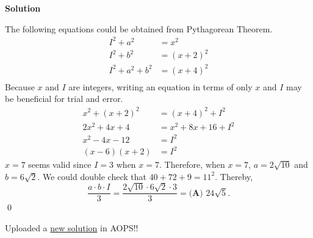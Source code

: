 \documentclass{article}
\newenvironment{solution}{\begin{trivlist}\item[]{\bf Solution}}{\qed \end{trivlist}}
\begin{document}
\begin{solution}
\begin{center}
\end{center}
The following equations could be obtained from Pythagorean Theorem.
\begin{align*}
    I^2+a^2&=x^2 \\
    I^2+b^2&=(x+2)^2 \\
    I^2+a^2+b^2&=(x+4)^2 \\
\end{align*}
Because $x$ and $I$ are integers, writing an equation in terms of only $x$ and $I$ may be beneficial for trial and error.
\begin{align*}
    x^2+(x+2)^2&=(x+4)^2+I^2 \\
    2x^2+4x+4&=x^2+8x+16+I^2 \\
    x^2-4x-12&=I^2 \\
    (x-6)(x+2)&=I^2
\end{align*}
$x=7$ seems valid since $I=3$ when $x=7$. Therefore, when $x=7$, $a=2\sqrt{10}$ and $b=6\sqrt{2}$. We could double check that $40+72+9=11^2$. Thereby,
\[
\frac{a\cdot b\cdot I}{3}=\frac{2\sqrt{10}\cdot6\sqrt{2}\cdot3}{3}=\boxed{\textbf{(A) }24\sqrt5}.
\]
\end{solution}
Uploaded a \href{https://artofproblemsolving.com/wiki/index.php/2021_AMC_12B_Problems/Problem_14#Solution_3}{new solution} in AOPS!! \\
\end{document}
